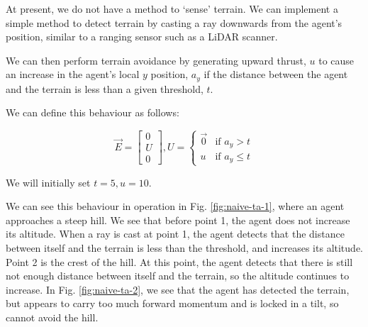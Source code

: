\documentclass[12pt]{article}
\begin{document}
At present, we do not have a method to `sense' terrain. We can implement a simple method to detect terrain by casting a ray downwards from the agent's position, similar to a ranging sensor such as a LiDAR scanner.

We can then perform terrain avoidance by generating upward thrust, $u$ to cause an increase in the agent's local $y$ position, $a_y$ if the distance between the agent and the terrain is less than a given threshold, $t$. 

We can define this behaviour as follows:

\begin{equation}
    \vec{E} = \begin{bmatrix}
        0 \\
        U \\
        0
    \end{bmatrix}, U =
    \begin{cases}
        \vec{0} & \text{if } a_y > t \\
        u & \text{if } a_y \leq t
    \end{cases}
\end{equation}

We will initially set $t=5,u=10$.

We can see this behaviour in operation in Fig. \ref{fig:naive-ta-1}, where an agent approaches a steep hill. We see that before point 1, the agent does not increase its altitude. When a ray is cast at point 1, the agent detects that the distance between itself and the terrain is less than the threshold, and increases its altitude. Point 2 is the crest of the hill. At this point, the agent detects that there is still not enough distance between itself and the terrain, so the altitude continues to increase. In Fig. \ref{fig:naive-ta-2}, we see that the agent has detected the terrain, but appears to carry too much forward momentum and is locked in a tilt, so cannot avoid the hill.
\end{document}
